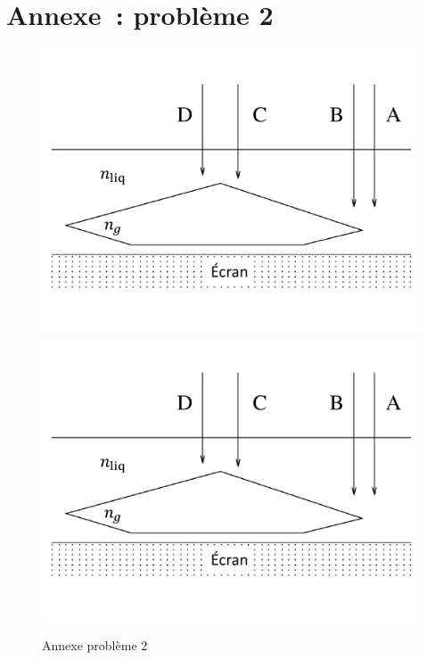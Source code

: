 \documentclass[a4paper, 11pt, garamond, oneside]{book}
\begin{document}
{	\newpage
	\chapter*{Annexe~: problème 2}

	\begin{figure}[htbp]
		\centering
		{\includegraphics[width=.7\linewidth]{gemme_e}}
		{\includegraphics[width=.7\linewidth]{gemme_e}}
		\caption{Annexe problème 2}
	\end{figure}
}
\end{document}
